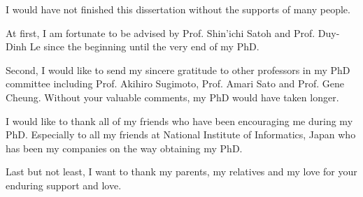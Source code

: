 
\begin{acknowledgements}      


I would have not finished this dissertation without the supports of many people. 

At first, I am fortunate to be advised by Prof. Shin'ichi Satoh and Prof. Duy-Dinh Le since the beginning until the very end of my PhD. 

Second, I would like to send my sincere gratitude to other professors in my PhD committee including Prof. Akihiro Sugimoto, Prof. Amari Sato and Prof. Gene Cheung. Without your valuable comments, my PhD would have taken longer. 

I would like to thank all of my friends who have been encouraging me during my PhD. Especially to all my friends at National Institute of Informatics, Japan who has been my companies on the way obtaining my PhD.  

Last but not least, I want to thank my parents, my relatives and my love for your enduring support and love. 

\end{acknowledgements}
